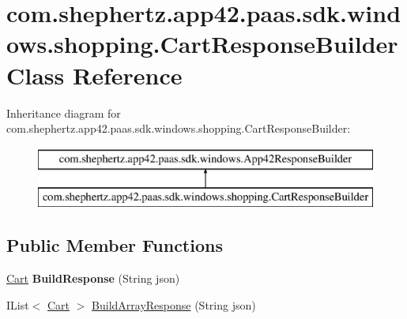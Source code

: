 \hypertarget{classcom_1_1shephertz_1_1app42_1_1paas_1_1sdk_1_1windows_1_1shopping_1_1_cart_response_builder}{\section{com.\+shephertz.\+app42.\+paas.\+sdk.\+windows.\+shopping.\+Cart\+Response\+Builder Class Reference}
\label{classcom_1_1shephertz_1_1app42_1_1paas_1_1sdk_1_1windows_1_1shopping_1_1_cart_response_builder}
}
Inheritance diagram for com.\+shephertz.\+app42.\+paas.\+sdk.\+windows.\+shopping.\+Cart\+Response\+Builder\+:\begin{figure}[H]
\begin{center}
\leavevmode
\includegraphics[height=2.000000cm]{classcom_1_1shephertz_1_1app42_1_1paas_1_1sdk_1_1windows_1_1shopping_1_1_cart_response_builder}
\end{center}
\end{figure}
\subsection*{Public Member Functions}
\begin{DoxyCompactItemize}
\item 
\hypertarget{classcom_1_1shephertz_1_1app42_1_1paas_1_1sdk_1_1windows_1_1shopping_1_1_cart_response_builder_aea48ca2c0bf7214b18745d55a1c5531f}{\hyperlink{classcom_1_1shephertz_1_1app42_1_1paas_1_1sdk_1_1windows_1_1shopping_1_1_cart}{Cart} {\bfseries Build\+Response} (String json)}\label{classcom_1_1shephertz_1_1app42_1_1paas_1_1sdk_1_1windows_1_1shopping_1_1_cart_response_builder_aea48ca2c0bf7214b18745d55a1c5531f}

\item 
I\+List$<$ \hyperlink{classcom_1_1shephertz_1_1app42_1_1paas_1_1sdk_1_1windows_1_1shopping_1_1_cart}{Cart} $>$ \hyperlink{classcom_1_1shephertz_1_1app42_1_1paas_1_1sdk_1_1windows_1_1shopping_1_1_cart_response_builder_a4d05e02d1a0f9fe6bcad8f57f8d8bfcd}{Build\+Array\+Response} (String json)
\end{DoxyCompactItemize}


